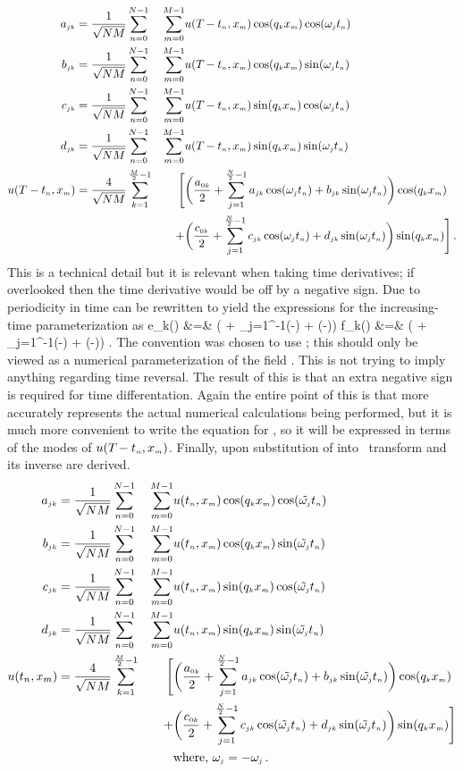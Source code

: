 \begin{alignat}{2}
\label{e-rfftdown}
\ajk=\frac{1}{\sqrt{NM}}&\sum_{n=0}^{N-1} &\sum_{m = 0}^{M - 1}& u(\period{}-\tn, \xm)  \cos(\wavek \xm) \cos(\omegaj \tn) \continue
\bjk=\frac{1}{\sqrt{NM}}&\sum_{n=0}^{N-1} &\sum_{m = 0}^{M - 1}& u(\period{}-\tn, \xm)  \cos(\wavek \xm) \sin(\omegaj \tn) \continue
\cjk=\frac{1}{\sqrt{NM}}&\sum_{n=0}^{N-1} &\sum_{m = 0}^{M - 1}&u(\period{}-\tn, \xm) \sin(\wavek \xm) \cos(\omegaj \tn) \continue
\djk=\frac{1}{\sqrt{NM}}&\sum_{n=0}^{N-1} &\sum_{m = 0}^{M - 1}&u(\period{}-\tn, \xm) \sin(\wavek \xm) \sin(\omegaj \tn) \continue
u(T-\tn, \xm)=\frac{4}{\sqrt{NM}}&\sum_{k = 1}^{\frac{M}{2} - 1}&\Bigg[&\bigg(\frac{\azk}{2} + \sum_{j=1}^{\frac{N}{2}-1}\ajk\cos(\omegaj \tn)+\bjk\sin(\omegaj\tn)\bigg)\cos(\wavek \xm) \continue
&&+&\bigg(\frac{\czk}{2} + \sum_{j=1}^{\frac{N}{2}-1}\cjk\cos(\omegaj\tn)+\djk\sin(\omegaj\tn)\bigg)\sin(\wavek \xm)\Bigg] \,.
\end{alignat}
This is a technical detail but it is relevant when taking time derivatives; if
overlooked then the time derivative would be off by a negative sign.
Due to periodicity in time  can be rewritten to yield the expressions for the increasing-time parameterization as
\bea \label{e-timerfft}
e_k(\tn) &=&  \Big( + \sum_{j=1}^{-1}\ajk\cos(-\omegaj \tn) + \bjk\sin(-\omegaj \tn)\Big) \continue
f_k(\tn) &=&  \Big( + \sum_{j=1}^{-1}\cjk\cos(-\omegaj \tn) + \djk\sin(-\omegaj \tn)\Big) \;.
\eea
The convention was chosen to use ; this should only be viewed as a numerical parameterization of the field \ufield. This is not
trying to imply anything regarding time reversal. The result of this is that an extra negative sign is required
for time differentation.  Again the entire point of this is that  more accurately represents the actual numerical calculations being
performed, but  it is much more convenient to write the equation for \dufield, so it will be expressed in terms of the modes of $u({T_{}}-t_{\scriptscriptstyle{n}}, x_{\scriptscriptstyle{m}})$.
Finally, upon substitution of  into  \spt\ transform and its inverse are derived.
\begin{alignat}{2}
\label{e-rfft}
\ajk=\frac{1}{\sqrt{NM}}&\sum_{n=0}^{N-1} &\sum_{m = 0}^{M - 1}& u(\tn, \xm)  \cos(\wavek \xm) \cos(\tilde{\omegaj} \tn) \continue
\bjk=\frac{1}{\sqrt{NM}}&\sum_{n=0}^{N-1} &\sum_{m = 0}^{M - 1}& u(\tn, \xm)  \cos(\wavek \xm) \sin(\tilde{\omegaj} \tn) \continue
\cjk=\frac{1}{\sqrt{NM}}&\sum_{n=0}^{N-1} &\sum_{m = 0}^{M - 1}&u(\tn, \xm) \sin(\wavek \xm) \cos(\tilde{\omegaj}\tn) \continue
\djk=\frac{1}{\sqrt{NM}}&\sum_{n=0}^{N-1} &\sum_{m = 0}^{M - 1}&u(\tn, \xm) \sin(\wavek \xm) \sin(\tilde{\omegaj} \tn) \continue
\dufield=\frac{4}{\sqrt{NM}}&\sum_{k = 1}^{\frac{M}{2} - 1}&\Bigg[&\bigg(\frac{\azk}{2} + \sum_{j=1}^{\frac{N}{2}-1}\ajk\cos(\tilde{\omegaj} \tn)+\bjk\sin(\tilde{\omegaj}\tn)\bigg)\cos(\wavek \xm) \continue
&&+&\bigg(\frac{\czk}{2} + \sum_{j=1}^{\frac{N}{2}-1}\cjk\cos(\tilde{\omegaj} \tn)+\djk\sin(\tilde{\omegaj}\tn)\bigg)\sin(\wavek \xm)\Bigg] \continue
&&\quad&\mbox{where, } \omegaj = -\omegaj\,.
\end{alignat}
